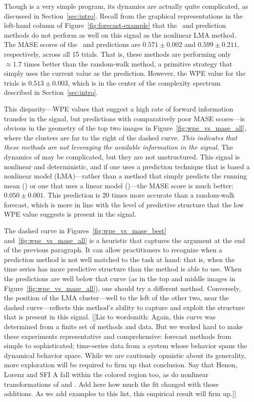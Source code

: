 Though \col is a very simple program, its dynamics are actually quite
complicated, as discussed in Section~\ref{sec:intro}.  Recall from the
graphical representations in the left-hand column of
Figure~\ref{fig:forecast-example} that the \naive ~and \arima
prediction methods do not perform as well on this signal as the
nonlinear LMA method.  The MASE scores of the \naive ~and \arima
predictions are $0.571 \pm 0.002$ and $0.599 \pm 0.211$, respectively,
across all 15 trials.  That is, these methods are performing only
$\approx 1.7$ times better than the random-walk method, a primitive
strategy that simply uses the current value as the prediction.
However, the WPE value for the \col trials is $0.513 \pm 0.003$, which
is in the center of the complexity spectrum described in
Section~\ref{sec:intro}.

This disparity---WPE values that suggest a high rate of forward
information transfer in the signal, but predictions with comparatively
poor MASE scores---is obvious in the geometry of the top two images in
Figure~\ref{fig:wpe_vs_mase_all}, where the \col clusters are far to
the right of the dashed curve.  \emph{This indicates that these
  methods are not leveraging the available information in the signal}.
The dynamics of \col may be complicated, but they are not
unstructured.  This signal is nonlinear and
deterministic\cite{mytkowicz09}, and if one uses a prediction
technique that is based a nonlinear model (LMA)---rather than a method
that simply predicts the running mean (\naive) or one that uses a
linear model (\arima)---the MASE score is much better: $0.050 \pm
0.001$.  This prediction is 20 times more accurate than a random-walk
forecast, which is more in line with the level of predictive structure
that the low WPE value suggests is present in the signal.

The dashed curve in Figures~\ref{fig:wpe_vs_mase_best}
and~\ref{fig:wpe_vs_mase_all} is a heuristic that captures the
argument at the end of the previous paragraph.  It can allow
practitioners to recognize when a prediction method is not well
matched to the task at hand: that is, when the time series has more
predictive structure than the method is able to use.  When the
predictions are well below that curve (as in the top and middle images
in Figure~\ref{fig:wpe_vs_mase_all}), one should try a different
method.  Conversely, the position of the LMA cluster---well to the
left of the other two, near the dashed curve---reflects this method's
ability to capture and exploit the structure that is present in this
signal.  [[Liz to wordsmith: Again, this curve was determined from a
    finite set of methods and data.  But we worked hard to make these
    experiments representative and comprehensive: forecast methods
    from simple to sophisticated; time-series data from a system whose
    behavior spans the dynamical behavior space.  While we are
    cautiously opmistic about its generality, more exploration will be
    required to firm up that conclusion.  Say that Henon, Lorenz and
    SFI A fall within the colored region too, as do nonlinear
    transformations of \svdtwo and \svdsix.  Add here how much the fit
    changed with those additions.  As we add examples to this list,
    this empirical result will firm up.]]

